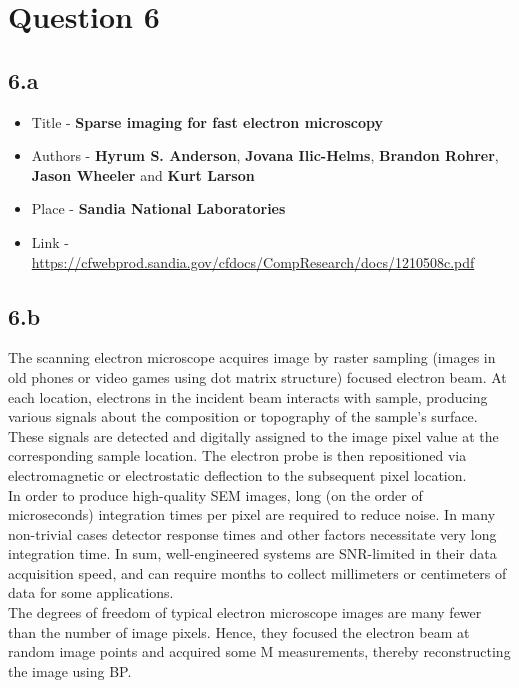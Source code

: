 \documentclass[12pt]{article}
\begin{document}
\section*{Question 6}
\subsection*{6.a}
\begin{itemize}
    \item Title - \textbf{Sparse imaging for fast electron microscopy}
    \item Authors - \textbf{Hyrum S. Anderson}, \textbf{ Jovana Ilic-Helms}, \textbf{Brandon Rohrer}, \textbf{Jason Wheeler} and \textbf{Kurt Larson}
    \item Place - \textbf{Sandia National Laboratories}
    \item Link - \href{https://cfwebprod.sandia.gov/cfdocs/CompResearch/docs/1210508c.pdf}{https://cfwebprod.sandia.gov/cfdocs/CompResearch/docs/1210508c.pdf}
\end{itemize}
\subsection*{6.b}
The scanning electron microscope acquires image by raster sampling (images in old phones or video games using dot matrix structure) focused electron beam. At each location, electrons in the incident beam interacts with sample, producing various signals about the composition or topography of the sample’s surface. These signals are  detected and digitally assigned to the image pixel value at the corresponding sample location. The electron probe is then repositioned via electromagnetic or electrostatic deflection to the subsequent pixel location.\\
In order to produce high-quality SEM images, long (on the order of microseconds) integration times per pixel are required to reduce noise. In many non-trivial cases detector response times and other factors necessitate very long integration time. In sum, well-engineered systems are SNR-limited in their data acquisition speed, and can require months to collect millimeters or centimeters of data for some applications.\\
The degrees of freedom of typical electron microscope images are many fewer than the number of image pixels. Hence, they focused the electron beam at random image points and acquired some M measurements, thereby reconstructing the image using BP.
\end{document}
